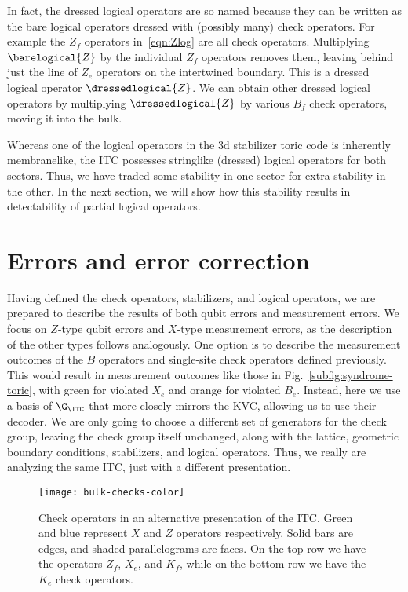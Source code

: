 In fact, the dressed logical operators are so named because they can be written as the bare logical operators dressed with (possibly many) check operators. For example the $Z_f$ operators in~\ref{eqn:Zlog} are all check operators. Multiplying $\barelogical{Z}$ by the individual $Z_f$ operators removes them, leaving behind just the line of $Z_e$ operators on the intertwined boundary. This is a dressed logical operator $\dressedlogical{Z}$. We can obtain other dressed logical operators by multiplying $\dressedlogical{Z}$ by various $B_f$ check operators, moving it into the bulk.

Whereas one of the logical operators in the 3d stabilizer toric code is inherently membranelike, the ITC possesses stringlike (dressed) logical operators for both sectors. Thus, we have traded some stability in one sector for extra stability in the other. In the next section, we will show how this stability results in detectability of partial logical operators.

\section{Errors and error correction} \label{sec:errors}

Having defined the check operators, stabilizers, and logical operators, we are prepared to describe the results of both qubit errors and measurement errors. We focus on $Z$-type qubit errors and $X$-type measurement errors, as the description of the other types follows analogously. One option is to describe the measurement outcomes of the $B$ operators and single-site check operators defined previously. This would result in measurement outcomes like those in Fig.~\ref{subfig:syndrome-toric}, with green for violated $X_e$ and orange for violated $B_e$. Instead, here we use a basis of $\G_\ITC$ that more closely mirrors the KVC, allowing us to use their decoder. We are only going to choose a different set of generators for the check group, leaving the check group itself unchanged, along with the lattice, geometric boundary conditions, stabilizers, and logical operators. Thus, we really are analyzing the same ITC, just with a different presentation. 

\begin{figure}[ht!]
    \centering
    \texttt{[image: bulk-checks-color]}
    \caption[Check operators in an alternative presentation of the ITC]{Check operators in an alternative presentation of the ITC. Green and blue represent $X$ and $Z$ operators respectively. Solid bars are edges, and shaded parallelograms are faces. On the top row we have the operators $Z_f$, $X_e$, and $K_f$, while on the bottom row we have the $K_e$ check operators.}
    \label{fig:checks}
\end{figure}

